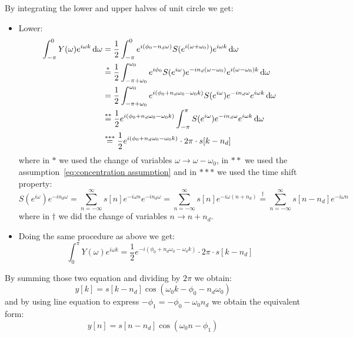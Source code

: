 \begin{enumerate}
          By integrating the lower and upper halves of unit circle we get:
          \begin{itemize}
              \item Lower:
                    \begin{align*}
                        \int_{-\pi}^{0} Y(\omega) e^{i\omega k}  \, \mathrm{d}\omega
                         & = \frac{1}{2} \int_{-\pi}^{0} e^{i(\phi_0 - n_d \omega)} S(e^{i(\omega + \omega_0)}) e^{i\omega k} \, \mathrm{d}\omega
                        \\ &\overset{*}{=} \frac{1}{2} \int_{-\pi + \omega_0}^{\omega_0} e^{i\phi_0} S(e^{i\omega}) e^{-i n_d (\omega - \omega_0)} e^{i(\omega - \omega_0) k} \, \mathrm{d}\omega
                        \\ &= \frac{1}{2} \int_{-\pi + \omega_0}^{\omega_0} e^{i(\phi_0 + n_d \omega_0 - \omega_0 k)} S(e^{i\omega}) e^{-i n_d \omega} e^{i\omega k} \, \mathrm{d}\omega
                        \\ &\overset{**}{=} \frac{1}{2} e^{i(\phi_0 + n_d \omega_0 - \omega_0 k)} \int_{-\pi}^{\pi} S(e^{i\omega}) e^{-i n_d \omega} e^{i\omega k}  \, \mathrm{d}\omega
                        \\ &\overset{***}{=} \frac{1}{2} e^{i(\phi_0 + n_d \omega_0 - \omega_0 k)} \cdot 2\pi \cdot s[k - n_d]
                    \end{align*}
                    where in $*$ we used the change of variables $\omega \to \omega - \omega_0$, in $**$ we used the assumption~\ref{eq:concentration assumption} and in $***$ we used the time shift property:
                    \[S(e^{i\omega}) e^{-i n_d \omega}
                        = \sum_{n = -\infty}^{\infty} s[n] e^{-i\omega n} e^{-i n_d \omega}
                        = \sum_{n = -\infty}^{\infty} s[n] e^{-i\omega (n+n_d)}
                        \overset{\dagger}{=} \sum_{n = -\infty}^{\infty} s[n - n_d] e^{-i\omega n}\]
                    where in $\dagger$ we did the change of variables $n \to n + n_d$.
              \item Doing the same procedure as above we get:
                    \[\int_{0}^{\pi} Y(\omega) e^{i\omega k}
                        = \frac{1}{2} e^{-i(\phi_0 + n_d \omega_0 - \omega_0 k)} \cdot 2\pi \cdot s[k - n_d]\]
          \end{itemize}

          By summing those two equation and dividing by $2\pi$ we obtain:
          \[y[k] = s[k - n_d] \cos(\omega_0 k - \phi_0 - n_d \omega_0)\]
          and by using line equation to express $-\phi_1 = -\phi_0 -\omega_0 n_d$ we obtain the equivalent form:
          \begin{equation} \label{eq:phase shift harmonic}
              y[n] = s[n - n_d] \cos(\omega_0 n - \phi_1)
          \end{equation}


\end{enumerate}
